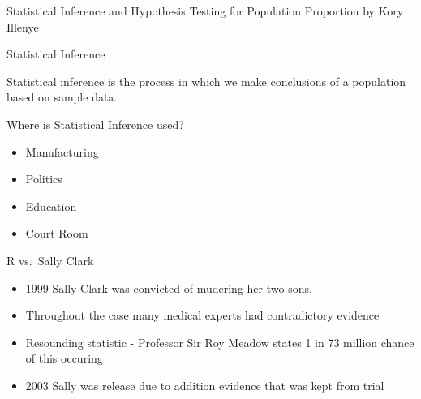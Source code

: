 \begin{frame}

Statistical Inference and Hypothesis Testing for Population Proportion
by Kory Illenye

\end{frame}

\begin{frame}{Statistical Inference}

Statistical inference is the process in which we make conclusions of a
population based on sample data.

\end{frame}

\begin{frame}{Where is Statistical Inference used?}

\begin{itemize}
\tightlist
\item
  Manufacturing
\item
  Politics
\item
  Education
\item
  Court Room
\end{itemize}

\end{frame}

\begin{frame}{R vs.~Sally Clark}

\begin{itemize}
\tightlist
\item
  1999 Sally Clark was convicted of mudering her two sons.
\item
  Throughout the case many medical experts had contradictory evidence
\item
  Resounding statistic - Professor Sir Roy Meadow states 1 in 73 million
  chance of this occuring
\item
  2003 Sally was release due to addition evidence that was kept from
  trial
\end{itemize}

\end{frame}

